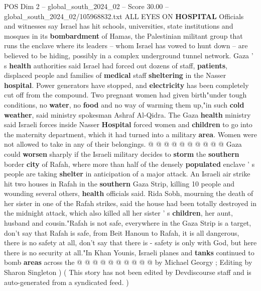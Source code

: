 \begin{textsample}{POS Dim 2 – global\_south\_2024\_02 – Score 30.00 – global\_south\_2024\_02/105968832.txt}
ALL EYES ON \textbf{HOSPITAL} Officials and witnesses say Israel has hit schools, universities, state institutions and mosques in its \textbf{bombardment} of Hamas, the Palestinian militant group that runs the enclave where its leaders -- whom Israel has vowed to hunt down -- are believed to be hiding, possibly in a complex underground tunnel network.
Gaza ' s \textbf{health} authorities said Israel had forced out dozens of staff, \textbf{patients}, displaced people and families of \textbf{medical} staff \textbf{sheltering} in the Nasser \textbf{hospital}.
Power generators have stopped, and \textbf{electricity} has been completely cut off from the compound.
Two pregnant women had given birth"under tough conditions, no \textbf{water}, no \textbf{food} and no way of warming them up,"in such \textbf{cold} \textbf{weather}, said ministry spokesman Ashraf Al-Qidra.
The Gaza \textbf{health} ministry said Israeli forces inside Nasser \textbf{Hospital} forced women and \textbf{children} to go into the maternity department, which it had turned into a military \textbf{area}.
Women were not allowed to take in any of their belongings. @ @ @ @ @ @ @ @ @ @ Gaza could \textbf{worsen} sharply if the Israeli military decides to \textbf{storm} the \textbf{southern} border \textbf{city} of Rafah, where more than half of the densely \textbf{populated} enclave ' s people are taking \textbf{shelter} in anticipation of a major attack.
An Israeli air strike hit two houses in Rafah in the \textbf{southern} Gaza Strip, killing 10 people and wounding several others, \textbf{health} officials said.
Rida Sobh, mourning the death of her sister in one of the Rafah strikes, said the house had been totally destroyed in the midnight attack, which also killed all her sister ' s \textbf{children}, her aunt, husband and cousin."Rafah is not safe, everywhere in the Gaza Strip is a target, don't say that Rafah is safe, from Beit Hanoun to Rafah, it is all dangerous, there is no safety at all, don't say that there is - safety is only with God, but here there is no security at all."In Khan Younis, Israeli planes and \textbf{tanks} continued to bomb \textbf{areas} across the @ @ @ @ @ @ @ @ @ @ by Michael Georgy ; Editing by Sharon Singleton ) ( This story has not been edited by Devdiscourse staff and is auto-generated from a syndicated feed. )

\end{textsample}
